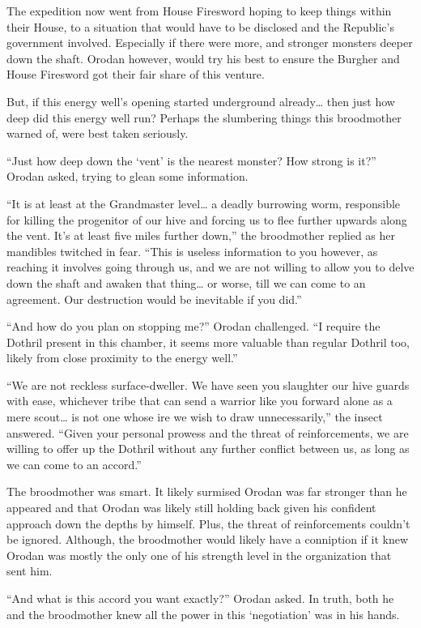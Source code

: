 \documentclass[a4paper,10pt]{book}
\begin{document}
The expedition now went from House Firesword hoping to keep things within their House, to a situation that would have to be disclosed and the Republic’s government involved. Especially if there were more, and stronger monsters deeper down the shaft. Orodan however, would try his best to ensure the Burgher and House Firesword got their fair share of this venture.\par
But, if this energy well’s opening started underground already… then just how deep did this energy well run? Perhaps the slumbering things this broodmother warned of, were best taken seriously.\par
“Just how deep down the ‘vent’ is the nearest monster? How strong is it?” Orodan asked, trying to glean some information.\par
“It is at least at the Grandmaster level… a deadly burrowing worm, responsible for killing the progenitor of our hive and forcing us to flee further upwards along the vent. It's at least five miles further down,” the broodmother replied as her mandibles twitched in fear. “This is useless information to you however, as reaching it involves going through us, and we are not willing to allow you to delve down the shaft and awaken that thing… or worse, till we can come to an agreement. Our destruction would be inevitable if you did.”\par
“And how do you plan on stopping me?” Orodan challenged. “I require the Dothril present in this chamber, it seems more valuable than regular Dothril too, likely from close proximity to the energy well.”\par
“We are not reckless surface-dweller. We have seen you slaughter our hive guards with ease, whichever tribe that can send a warrior like you forward alone as a mere scout… is not one whose ire we wish to draw unnecessarily,” the insect answered. “Given your personal prowess and the threat of reinforcements, we are willing to offer up the Dothril without any further conflict between us, as long as we can come to an accord.”\par
The broodmother was smart. It likely surmised Orodan was far stronger than he appeared and that Orodan was likely still holding back given his confident approach down the depths by himself. Plus, the threat of reinforcements couldn’t be ignored. Although, the broodmother would likely have a conniption if it knew Orodan was mostly the only one of his strength level in the organization that sent him.\par
“And what is this accord you want exactly?” Orodan asked. In truth, both he and the broodmother knew all the power in this ‘negotiation’ was in his hands.\par
\end{document}
